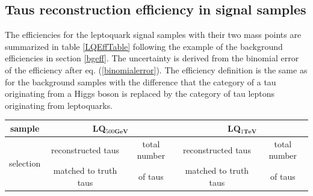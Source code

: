 \subsection{Taus reconstruction efficiency in signal samples}\label{signaleff}
The efficiencies for the leptoquark signal samples with their two mass points are summarized in table \ref{LQEffTable} following the example of the background efficiencies in section \ref{bgeff}. The uncertainty is derived from the binomial error of the efficiency after eq. (\ref{binomialerror}). The efficiency definition  is the same as for the background samples with the difference that the category of a tau originating from a Higgs boson is replaced by the category of tau leptons originating from leptoquarks.\par
%	
	\begin{table}
		\centering
                \footnotesize
                \renewcommand{\arraystretch}{1.2}
		\begin{tabular*}{\linewidth}{@{\extracolsep{\fill}}ccccc}
		\hline
		\hline
		 \textbf{sample}  & \multicolumn{2}{c}{\textbf{LQ$_{500\textbf{GeV}}$}}  & \multicolumn{2}{c}{\textbf{LQ$_{1\textbf{TeV}}$}} 
		\\
		\hline
		\multirow{2}{*}{selection}  & reconstructed taus       & total number  & reconstructed taus       & total number 
		\\
                & matched to truth taus & of taus       & matched to truth taus & of taus
                \\
		\hline

\end{tabular*}
\end{table}
